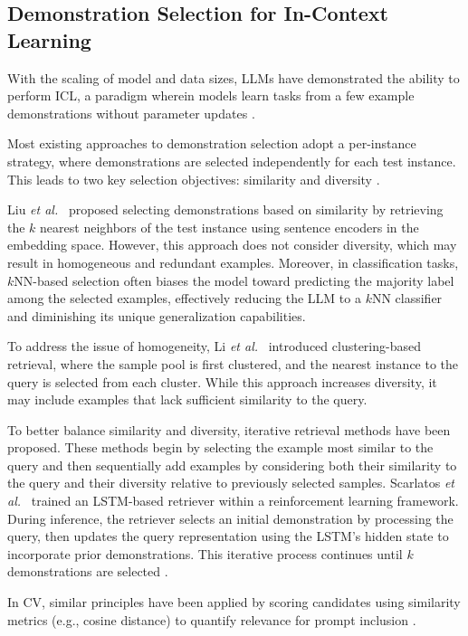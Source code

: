 \documentclass[journal,twocolumn]{IEEEtran}
\begin{document}
\subsection{Demonstration Selection for In-Context Learning}

With the scaling of model and data sizes, LLMs have demonstrated the ability to perform ICL, a paradigm wherein models learn tasks from a few example demonstrations without parameter updates \cite{dong-etal-2024-survey, achiam2023gpt}.

Most existing approaches to demonstration selection adopt a per-instance strategy, where demonstrations are selected independently for each test instance. This leads to two key selection objectives: similarity and diversity \cite{luo2024context}.

Liu \textit{et al.}~\cite{liu-etal-2022-makes} proposed selecting demonstrations based on similarity by retrieving the $k$ nearest neighbors of the test instance using sentence encoders in the embedding space. However, this approach does not consider diversity, which may result in homogeneous and redundant examples. Moreover, in classification tasks, $k$NN-based selection often biases the model toward predicting the majority label among the selected examples, effectively reducing the LLM to a $k$NN classifier and diminishing its unique generalization capabilities.

To address the issue of homogeneity, Li \textit{et al.}~\cite{li-etal-2024-self-prompting} introduced clustering-based retrieval, where the sample pool is first clustered, and the nearest instance to the query is selected from each cluster. While this approach increases diversity, it may include examples that lack sufficient similarity to the query.

To better balance similarity and diversity, iterative retrieval methods have been proposed. These methods begin by selecting the example most similar to the query and then sequentially add examples by considering both their similarity to the query and their diversity relative to previously selected samples. Scarlatos \textit{et al.}~\cite{scarlatos2023reticl} trained an LSTM-based retriever within a reinforcement learning framework. During inference, the retriever selects an initial demonstration by processing the query, then updates the query representation using the LSTM's hidden state to incorporate prior demonstrations. This iterative process continues until $k$ demonstrations are selected \cite{luo2024context}.

In CV, similar principles have been applied by scoring candidates using similarity metrics (e.g., cosine distance) to quantify relevance for prompt inclusion \cite{zhang2023makes}.
\end{document}
